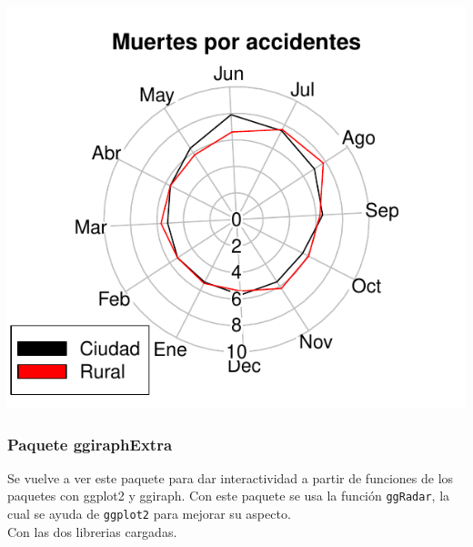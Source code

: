 \documentclass{article}\usepackage[]{graphicx}\usepackage[]{color}
\makeatletter
\def\maxwidth{ %
  \ifdim\Gin@nat@width>\linewidth
    \linewidth
  \else
    \Gin@nat@width
  \fi
}
\newenvironment{knitrout}{}{} %
\makeatother
\begin{document}
\begin{knitrout}
\color{fgcolor}

{\centering \includegraphics[width=\maxwidth]{figure/plot_plotrix_2-1} 

}



\end{knitrout}
\subsubsection{Paquete ggiraphExtra}
Se vuelve a ver este paquete\cite{docu_ggiraphExtra} para dar interactividad a partir de funciones de los paquetes con ggplot2 y ggiraph.
Con este paquete se usa la funci\'on \texttt{ggRadar}, la cual se ayuda de \texttt{ggplot2} para mejorar su aspecto.~\\
Con las dos librerias cargadas.
\end{document}
